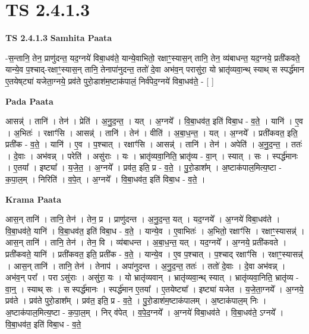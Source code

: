 \documentclass[17pt]{extarticle}
\begin{document}
\section{ TS 2.4.1.3 }

\textbf{TS 2.4.1.3 } \newline
\textbf{Samhita Paata} \newline

-स॒न्तानि॒ तेन॒ प्राणु॑दन्त॒ यद॒ग्नये॑ विबा॒धव॑ते॒ यान्ये॒वाभितो॒ रक्षाꣳ॒॒स्यास॒न् तानि॒ तेन॒ व्य॑बाधन्त॒ यद॒ग्नये॒ प्रती॑कवते॒ यान्ये॒व प॒श्चाद्-रक्षाꣳ॒॒स्यास॒न् तानि॒ तेनापा॑नुदन्त॒ ततो॑ दे॒वा अभ॑व॒न् परासु॑रा॒ यो भ्रातृ॑व्यवा॒न्थ् स्याथ् स स्पर्द्ध॑मान ए॒तयेष्‌ट्या॑ यजेता॒ग्नये॒ प्रव॑ते पुरो॒डाश॑म॒ष्टाक॑पालं॒ निर्व॑पेद॒ग्नये॑ विबा॒धव॑ते॒ - [  ] \newline

\textbf{Pada Paata} \newline

आसन्न्॑ । तानि॑ । तेन॑ । प्रेति॑ । अ॒नु॒द॒न्त॒ । यत् । अ॒ग्नये᳚ । वि॒बा॒धव॑त॒ इति॑ विबा॒ध - व॒ते॒ । यानि॑ । ए॒व । अ॒भितः॑ । रक्षाꣳ॑सि । आसन्न्॑ । तानि॑ । तेन॑ । वीति॑ । अ॒बा॒ध॒न्त॒ । यत् । अ॒ग्नये᳚ । प्रती॑कवत॒ इति॒ प्रती॑क - व॒ते॒ । यानि॑ । ए॒व । प॒श्चात् । रक्षाꣳ॑सि । आसन्न्॑ । तानि॑ । तेन॑ ।   अपेति॑ । अ॒नु॒द॒न्त॒ । ततः॑ । दे॒वाः । अभ॑वन्न् । परेति॑ । असु॑राः । यः । भ्रातृ॑व्यवा॒निति॒ भ्रातृ॑व्य - वा॒न् । स्यात् । सः । स्पर्द्ध॑मानः । ए॒तया᳚ । इष्ट्या᳚ । य॒जे॒त॒ । अ॒ग्नये᳚ । प्रव॑त॒ इति॒ प्र - व॒ते॒ । पु॒रो॒डाश᳚म् । अ॒ष्टाक॑पाल॒मित्य॒ष्टा - क॒पा॒ल॒म् । निरिति॑ । व॒पे॒त् । अ॒ग्नये᳚ । वि॒बा॒धव॑त॒ इति॑ विबा॒ध - व॒ते॒ ।  \newline


\textbf{Krama Paata} \newline

आस॒न् तानि॑ । तानि॒ तेन॑ । तेन॒ प्र । प्राणु॑दन्त । अ॒नु॒द॒न्त॒ यत् । यद॒ग्नये᳚ । अ॒ग्नये॑ विबा॒धव॑ते । वि॒बा॒धव॑ते॒ यानि॑ । वि॒बा॒धव॑त॒ इति॑ विबा॒ध - व॒ते॒ । यान्ये॒व । ए॒वाभितः॑ । अ॒भितो॒ रक्षाꣳ॑सि । रक्षाꣳ॒॒स्यासन्न्॑ । आस॒न् तानि॑ । तानि॒ तेन॑ । तेन॒ वि । व्य॑बाधन्त । अ॒बा॒ध॒न्त॒ यत् । यद॒ग्नये᳚ । अ॒ग्नये॒ प्रती॑कवते । प्रती॑कवते॒ यानि॑ । प्रती॑कवत॒ इति॒ प्रती॑क - व॒ते॒ । यान्ये॒व । ए॒व प॒श्चात् । प॒श्चाद् रक्षाꣳ॑सि । रक्षाꣳ॒॒स्यासन्न्॑ । आस॒न् तानि॑ । तानि॒ तेन॑ । तेनाप॑ । अपा॑नुदन्त । अ॒नु॒द॒न्त॒ ततः॑ । ततो॑ दे॒वाः । दे॒वा अभ॑वन्न् । अभ॑व॒न् परा᳚ । परा ऽसु॑राः । असु॑रा॒ यः । यो भ्रातृ॑व्यवान् । भ्रातृ॑व्यवा॒न्थ् स्यात् । भ्रातृ॑व्यवा॒निति॒ भ्रातृ॑व्य - वा॒न्॒ । स्याथ् सः । स स्पर्द्ध॑मानः । स्पर्द्ध॑मान ए॒तया᳚ । ए॒तयेष्ट्या᳚ । इष्ट्या॑ यजेत । य॒जे॒ता॒ग्नये᳚ । अ॒ग्नये॒ प्रव॑ते । प्रव॑ते पुरो॒डाश᳚म् । प्रव॑त॒ इति॒ प्र - व॒ते॒ । पु॒रो॒डाश॑म॒ष्टाक॑पालम् । अ॒ष्टाक॑पाल॒म् निः । अ॒ष्टाक॑पाल॒मित्य॒ष्टा - क॒पा॒ल॒म् । निर् व॑पेत् । व॒पे॒द॒ग्नये᳚ । अ॒ग्नये॑ विबा॒धव॑ते । वि॒बा॒धव॑ते॒ ऽग्नये᳚ । वि॒बा॒धव॑त॒ इति॑ विबा॒ध - व॒ते॒ \newline
\end{document}
